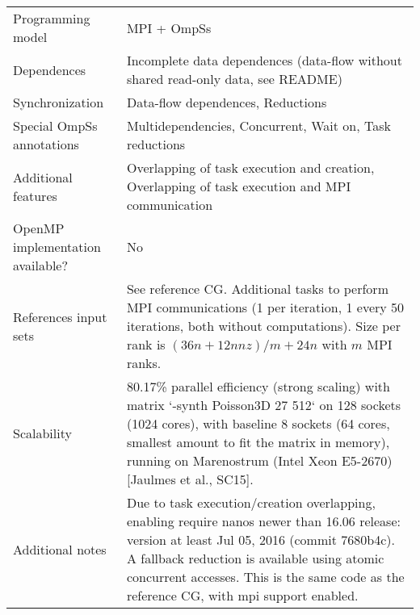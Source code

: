 \begin{table}[h!]
  \large
  \centering
  \begin{tabular}{|l|p{8cm}|}
    \hline
    Programming model                & MPI + OmpSs \\
    Dependences                      & Incomplete data dependences (data-flow without shared read-only data, see README) \\
    Synchronization                  & Data-flow dependences, Reductions \\
    Special OmpSs annotations        & Multidependencies, Concurrent, Wait on, Task reductions \\
    Additional features              & Overlapping of task execution and creation, Overlapping of task execution and MPI communication \\
    OpenMP implementation available? & No \\
    References input sets            & See reference CG. Additional tasks to perform MPI communications (1 per iteration, 1 every 50 iterations, both without computations). Size per rank is $(36 n + 12 nnz) / m + 24n$ with $m$ MPI ranks. \\
    Scalability                      & 80.17\% parallel efficiency (strong scaling) with matrix `-synth Poisson3D 27 512` on 128 sockets (1024 cores), with baseline 8 sockets (64 cores, smallest amount to fit the matrix in memory),
   running on Marenostrum (Intel Xeon E5-2670) [Jaulmes et al., SC15]. \\
    Additional notes                 & Due to task execution/creation overlapping, enabling require nanos newer than 16.06 release: version at least Jul 05, 2016 (commit 7680b4c). A fallback reduction is available using atomic concurrent accesses. This is the same code as the reference CG, with mpi support enabled. \\
    \hline
  \end{tabular}
\end{table}

\newpage

